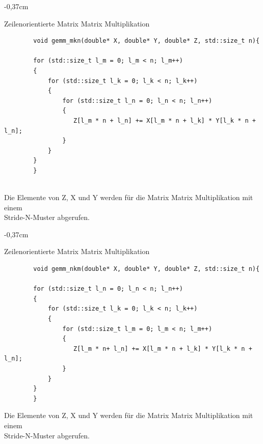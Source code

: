 \documentclass[sigconf,language=ngerman]{acmart}
\begin{document}
\begin{tiny}
    \begin{adjustwidth}{-0,37cm}{}
    \begin{footnotesize}
    \begin{auflistung}
    \caption{Zeilenorientierte Matrix Matrix Multiplikation}
    \label{fig:Zeilenorientierte Matrix Matrix Multiplikation}
    \begin{verbatim}
        void gemm_mkn(double* X, double* Y, double* Z, std::size_t n){
    
        for (std::size_t l_m = 0; l_m < n; l_m++)
        {
            for (std::size_t l_k = 0; l_k < n; l_k++)
            {
                for (std::size_t l_n = 0; l_n < n; l_n++)
                {
                   Z[l_m * n + l_n] += X[l_m * n + l_k] * Y[l_k * n + l_n];
                }
            }
        }
        }
        
    \end{verbatim}
    \end{auflistung}
    Die Elemente von Z, X und Y werden für die Matrix Matrix Multiplikation mit einem \\
    \hspace*{0.36cm}Stride-N-Muster abgerufen.
    \end{footnotesize}
    \end{adjustwidth}
    \end{tiny}


    \label{fig:Spaltenorientierte Matrix Matrix Multiplikation}
\begin{tiny}
    \begin{adjustwidth}{-0,37cm}{}
    \begin{footnotesize}
    \begin{auflistung}
    \caption{Zeilenorientierte Matrix Matrix Multiplikation}
    \begin{verbatim}
        void gemm_nkm(double* X, double* Y, double* Z, std::size_t n){

        for (std::size_t l_n = 0; l_n < n; l_n++)
        {
            for (std::size_t l_k = 0; l_k < n; l_k++)
            {
                for (std::size_t l_m = 0; l_m < n; l_m++)
                {
                   Z[l_m * n+ l_n] += X[l_m * n + l_k] * Y[l_k * n + l_n];
                }
            }
        }
        }
    \end{verbatim}
    \end{auflistung}
    Die Elemente von Z, X und Y werden für die Matrix Matrix Multiplikation mit einem \\
    \hspace*{0.36cm}Stride-N-Muster abgerufen.
    \end{footnotesize}
    \end{adjustwidth}
    \end{tiny}
\end{document}

